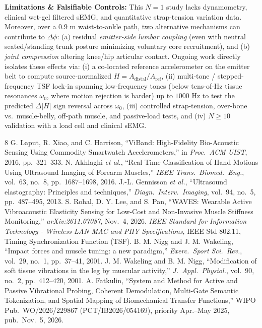 \documentclass[conference]{IEEEtran}
\begin{document}
\textbf{Limitations \& Falsifiable Controls:} This $N=1$ study lacks dynamometry, clinical wet-gel filtered sEMG, and quantitative strap-tension variation data. Moreover, over a $0.9\text{ m}$ waist-to-ankle path, two alternative mechanisms can contribute to $\Delta\phi$: (a) residual \textit{emitter-side lumbar coupling} (even with neutral seated/standing trunk posture minimizing voluntary core recruitment), and (b) \textit{joint compression} altering knee/hip articular contact. Ongoing work directly isolates these effects via: (i) a co-located reference accelerometer on the emitter belt to compute source-normalized $H = A_{\text{distal}}/A_{\text{ref}}$, (ii) multi-tone / stepped-frequency TSF lock-in spanning low-frequency tones (below tens-of-Hz tissue resonances $\omega_0$, where motion rejection is harder) up to $1000\text{ Hz}$ to test the predicted $\Delta|H|$ sign reversal across $\omega_0$, (iii) controlled strap-tension, over-bone vs.\ muscle-belly, off-path muscle, and passive-load tests, and (iv) $N \ge 10$ validation with a load cell and clinical sEMG.

\begin{thebibliography}{8}
\setlength{\itemsep}{1pt}
G. Laput, R. Xiao, and C. Harrison, ``ViBand: High-Fidelity Bio-Acoustic Sensing Using Commodity Smartwatch Accelerometers,'' in \textit{Proc.\ ACM UIST}, 2016, pp.\ 321--333.
N. Akhlaghi \textit{et al.}, ``Real-Time Classification of Hand Motions Using Ultrasound Imaging of Forearm Muscles,'' \textit{IEEE Trans.\ Biomed.\ Eng.}, vol.\ 63, no.\ 8, pp.\ 1687--1698, 2016.
J.-L. Gennisson \textit{et al.}, ``Ultrasound elastography: Principles and techniques,'' \textit{Diagn.\ Interv.\ Imaging}, vol.\ 94, no.\ 5, pp.\ 487--495, 2013.
S. Rohal, D. Y. Lee, and S. Pan, ``WAVES: Wearable Active Vibroacoustic Elasticity Sensing for Low-Cost and Non-Invasive Muscle Stiffness Monitoring,'' \textit{arXiv:2611.07087}, Nov.\ 4, 2026.
\textit{IEEE Standard for Information Technology - Wireless LAN MAC and PHY Specifications}, IEEE Std 802.11, Timing Synchronization Function (TSF).
B. M. Nigg and J. M. Wakeling, ``Impact forces and muscle tuning: a new paradigm,'' \textit{Exerc.\ Sport Sci.\ Rev.}, vol.\ 29, no.\ 1, pp.\ 37--41, 2001.
J. M. Wakeling and B. M. Nigg, ``Modification of soft tissue vibrations in the leg by muscular activity,'' \textit{J.\ Appl.\ Physiol.}, vol.\ 90, no.\ 2, pp.\ 412--420, 2001.
A. Fatkulin, ``System and Method for Active and Passive Vibrational Probing, Coherent Demodulation, Multi-Gate Semantic Tokenization, and Spatial Mapping of Biomechanical Transfer Functions,'' WIPO Pub.\ WO/2026/229867 (PCT/IB2026/054169), priority Apr.--May 2025, pub.\ Nov.\ 5, 2026.
\end{thebibliography}
\end{document}
